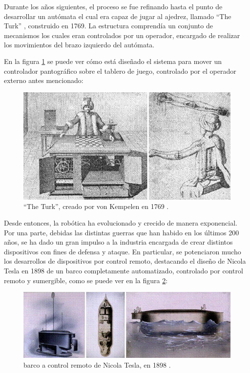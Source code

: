 Durante los años siguientes, el proceso se fue refinando hasta el punto de desarrollar un autómata
el cual era capaz de jugar al ajedrez, llamado ``The Turk'' \cite{standage_tom_turk_2002}, construido
en 1769. La estructura comprendía un conjunto de mecanismos los cuales eran controlados por un operador,
encargado de realizar los movimientos del brazo izquierdo del autómata.

En la figura \ref{fig:turk} se puede ver cómo está diseñado el sistema para mover un controlador 
pantográfico sobre el tablero de juego, controlado por el operador externo antes mencionado:

\begin{figure}[H]
    \centering
    \includegraphics[width=.75\linewidth]{pictures/chess_evolution.png}
    \caption{``The Turk'', creado por von Kempelen en 1769 \cite{standage_tom_turk_2002}.}
    \label{fig:turk}
\end{figure}

Desde entonces, la robótica ha evolucionado y crecido de manera exponencial. Por una parte, debidas
las distintas guerras que han habido en los últimos 200 años, se ha dado un gran impulso a la 
industria encargada de crear distintos dispositivos con fines de defensa y ataque. En particular,
se potenciaron mucho los desarrollos de dispositivos por control remoto, destacando el diseño de
Nicola Tesla en 1898 de un barco completamente automatizado, controlado por control remoto y sumergible,
como se puede ver en la figura \ref{fig:nicola_tesla_boat}:

\begin{figure}[H]
    \centering
    \includegraphics[width=.75\linewidth]{pictures/nicola_tesla_boat.png}
    \caption{barco a control remoto de Nicola Tesla, en 1898 \cite{belarmino_j_and_moran_me_and_firoozi_f_and_capello_s_and_kolios_e_and_perrotti_m_teslas_2005}.}
    \label{fig:nicola_tesla_boat}
\end{figure}

